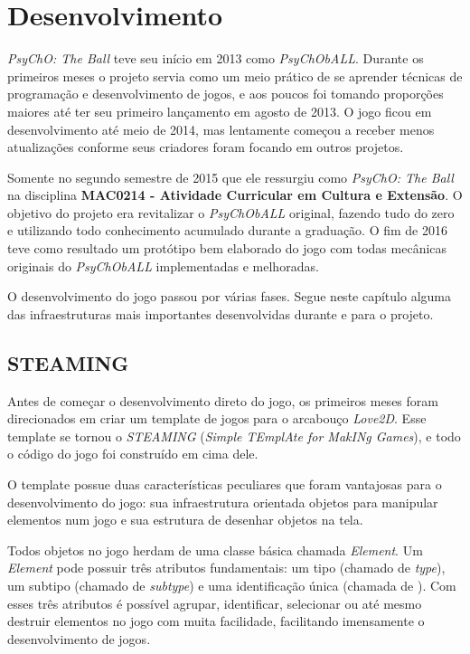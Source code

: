 \chapter{Desenvolvimento}
\label{cap:desenvolvimento}

\textit{PsyChO: The Ball} teve seu início em 2013 como \textit{PsyChObALL}. Durante os primeiros meses o projeto servia como um meio prático de se aprender técnicas de programação e desenvolvimento de jogos, e aos poucos foi tomando proporções maiores até ter seu primeiro lançamento em agosto de 2013. O jogo ficou em desenvolvimento até meio de 2014, mas lentamente começou a receber menos atualizações conforme seus criadores foram focando em outros projetos.

Somente no segundo semestre de 2015 que ele ressurgiu como \textit{PsyChO: The Ball} na disciplina \textbf{MAC0214 - Atividade Curricular em Cultura e Extensão}. O objetivo do projeto era revitalizar o \textit{PsyChObALL} original, fazendo tudo do zero e utilizando todo conhecimento acumulado durante a graduação. O fim de 2016 teve como resultado um protótipo bem elaborado do jogo com todas mecânicas originais do \textit{PsyChObALL} implementadas e melhoradas.

O desenvolvimento do jogo passou por várias fases. Segue neste capítulo alguma das infraestruturas mais importantes desenvolvidas durante e para o projeto.

\section{STEAMING}
\label{sec:steaming}

Antes de começar o desenvolvimento direto do jogo, os primeiros meses foram direcionados em criar um template de jogos para o arcabouço \textit{Love2D}. Esse template se tornou o \textit{STEAMING} (\textit{Simple TEmplAte for MakINg Games}), e todo o código do jogo foi construído em cima dele.

O template possue duas características peculiares que foram vantajosas para o desenvolvimento do jogo: sua infraestrutura orientada objetos para manipular elementos num jogo e sua estrutura de desenhar objetos na tela.

Todos objetos no jogo herdam de uma classe básica chamada \textit{Element}. Um \textit{Element} pode possuir três atributos fundamentais: um tipo (chamado de \textit{type}), um subtipo (chamado de \textit{subtype}) e uma identificação única (chamada de ). Com esses três atributos é possível agrupar, identificar, selecionar ou até mesmo destruir elementos no jogo com muita facilidade, facilitando imensamente o desenvolvimento de jogos.

